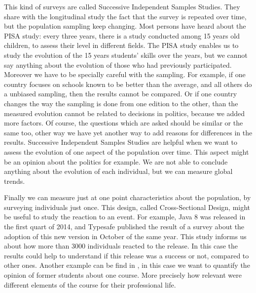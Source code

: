 \documentclass{article}
\begin{document}
This kind of surveys are called Successive Independent Samples Studies. They share with the longitudinal study the fact that the survey is repeated over time, but the population sampling keep changing. Most persons have heard about the PISA study: every three years, there is a study conducted among 15 years old children, to assess their level in different fields. The PISA study enables us to study the evolution of the 15 years students' skills over the years, but we cannot say anything about the evolution of those who had previously participated. Moreover we have to be specially careful with the sampling. For example, if one country focuses on schools known to be better than the average, and all others do a unbiased sampling, then the results cannot be compared.  Or if one country changes the way the sampling is done from one edition to the other, than the measured evolution cannot be related to decisions in politics, because we added more factors. Of course, the questions which are asked should be similar or the same too, other way we have yet another way to add reasons for differences in the results.
Successive Independent Samples Studies are helpful when we want to assess the evolution of one aspect of the population over time. This aspect might be an opinion about the politics for example. We are not able to conclude anything about the evolution of each individual, but we can measure global trends.

Finally we can measure just at one point characteristics about the population, by surveying individuals just once. This design, called Cross-Sectional Design, might be useful to study the reaction to an event. For example, Java 8 was released in the first quart of 2014, and Typesafe published the result of a survey about the adoption of this new version in October of the same year. This study informs us about how more than 3000 individuals reacted to the release. In this case the results could help to understand if this release was a success or not, compared to other ones. Another example can be find in \cite{DBLP:dblp_conf/er/TortOP13}, in this case we want to quantify the opinion of former students about one course. More precisely how relevant were different elements of the course for their professional life.
\end{document}
